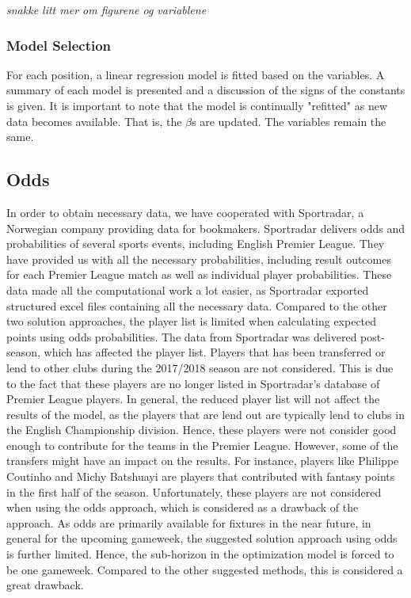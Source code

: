 \textit{snakke litt mer om figurene og variablene}

\subsubsection{Model Selection}

For each position, a linear regression model is fitted based on the variables. A summary of each model is presented and a discussion of the signs of the constants is given. It is important to note that the model is continually "refitted" as new data becomes available. That is, the $\beta $s are updated. The variables remain the same. \newpar

\subsection{Odds}
In order to obtain necessary data, we have cooperated with Sportradar, a Norwegian company providing data for bookmakers. Sportradar delivers odds and probabilities of several sports events, including English Premier League. They have provided us with all the necessary probabilities, including result outcomes for each Premier League match as well as individual player probabilities. These data made all the computational work a lot easier, as Sportradar exported structured excel files containing all the necessary data. 
\newpar
Compared to the other two solution approaches, the player list is limited when calculating expected points using odds probabilities. The data from Sportradar was delivered post-season, which has affected the player list. Players that has been transferred or lend to other clubs during the 2017/2018 season are not considered. This is due to the fact that these players are no longer listed in Sportradar's database of Premier League players. In general, the reduced player list will not affect the results of the model, as the players that are lend out are typically lend to clubs in the English Championship division. Hence, these players were not consider good enough to contribute for the teams in the Premier League. However, some of the transfers might have an impact on the results. For instance, players like Philippe Coutinho and Michy Batshuayi are players that contributed with fantasy points in the first half of the season. Unfortunately, these players are not considered when using the odds approach, which is considered as a drawback of the approach.  
\newpar
As odds are primarily available for fixtures in the near future, in general for the upcoming gameweek, the suggested solution approach using odds is further limited. Hence, the sub-horizon in the optimization model is forced to be one gameweek. Compared to the other suggested methods, this is considered a great drawback.

